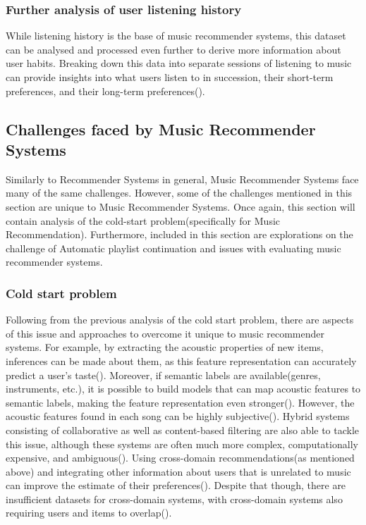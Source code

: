 \documentclass{l4proj}
\begin{document}
\subsubsection{Further analysis of user listening history} While listening history is the base of music recommender systems, this dataset can be analysed and processed even further to derive more information about user habits. Breaking down this data into separate sessions of listening to music can provide insights into what users listen to in succession, their short-term preferences, and their long-term preferences(\cite{Paul_Kundu_2019}).
\subsection{Challenges faced by Music Recommender Systems}
Similarly to Recommender Systems in general, Music Recommender Systems face many of the same challenges. However, some of the challenges mentioned in this section are unique to Music Recommender Systems. Once again, this section will contain analysis of the cold-start problem(specifically for Music Recommendation). Furthermore, included in this section are explorations on the challenge of Automatic playlist continuation and issues with evaluating music recommender systems.
\subsubsection{Cold start problem} Following from the previous analysis of the cold start problem, there are aspects of this issue and approaches to overcome it unique to music recommender systems. For example, by extracting the acoustic properties of new items, inferences can be made about them, as this feature representation can accurately predict a user's taste(\cite{Schedl_Zamani_Chen_Deldjoo_Elahi_2018}). Moreover, if semantic labels are available(genres, instruments, etc.), it is possible to build models that can map acoustic features to semantic labels, making the feature representation even stronger(\cite{Schedl_Zamani_Chen_Deldjoo_Elahi_2018}). However, the acoustic features found in each song can be highly subjective(\cite{Schedl_Zamani_Chen_Deldjoo_Elahi_2018}). Hybrid systems consisting of collaborative as well as content-based filtering are also able to tackle this issue, although these systems are often much more complex, computationally expensive, and ambiguous(\cite{Schedl_Zamani_Chen_Deldjoo_Elahi_2018}). Using cross-domain recommendations(as mentioned above) and integrating other information about users that is unrelated to music can improve the estimate of their preferences(\cite{Schedl_Zamani_Chen_Deldjoo_Elahi_2018}). Despite that though, there are insufficient datasets for cross-domain systems, with cross-domain systems also requiring users and items to overlap(\cite{Schedl_Zamani_Chen_Deldjoo_Elahi_2018}).
\end{document}
